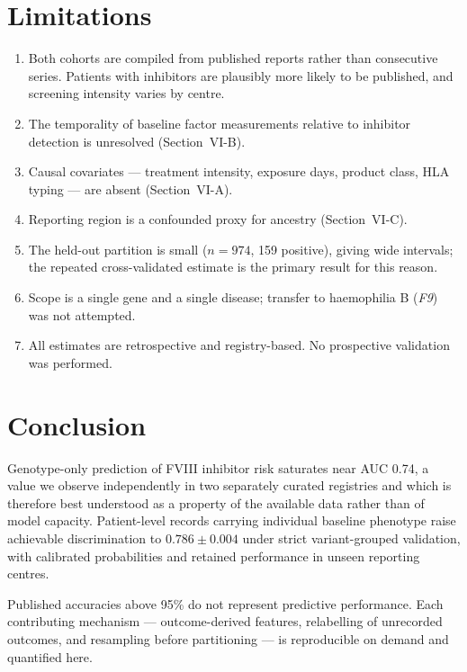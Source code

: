 \documentclass[conference]{IEEEtran}
\begin{document}
\section{Limitations}
\begin{enumerate}
\item Both cohorts are compiled from published reports rather than consecutive
      series. Patients with inhibitors are plausibly more likely to be
      published, and screening intensity varies by centre.
\item The temporality of baseline factor measurements relative to inhibitor
      detection is unresolved (Section~VI-B).
\item Causal covariates --- treatment intensity, exposure days, product class,
      HLA typing --- are absent (Section~VI-A).
\item Reporting region is a confounded proxy for ancestry (Section~VI-C).
\item The held-out partition is small ($n = 974$, 159 positive), giving wide
      intervals; the repeated cross-validated estimate is the primary result
      for this reason.
\item Scope is a single gene and a single disease; transfer to haemophilia B
      (\textit{F9}) was not attempted.
\item All estimates are retrospective and registry-based. No prospective
      validation was performed.
\end{enumerate}

\section{Conclusion}
Genotype-only prediction of FVIII inhibitor risk saturates near AUC 0.74, a
value we observe independently in two separately curated registries and which
is therefore best understood as a property of the available data rather than of
model capacity. Patient-level records carrying individual baseline phenotype
raise achievable discrimination to $0.786 \pm 0.004$ under strict
variant-grouped validation, with calibrated probabilities and retained
performance in unseen reporting centres.

Published accuracies above 95\% do not represent predictive performance. Each
contributing mechanism --- outcome-derived features, relabelling of unrecorded
outcomes, and resampling before partitioning --- is reproducible on demand and
quantified here.
\end{document}
